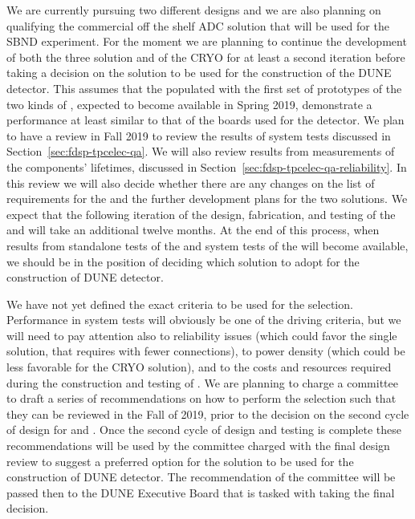 We are currently pursuing two different  designs
and we are also planning on qualifying the commercial off the
shelf ADC solution that will be used for the SBND experiment.
For the moment we are planning to continue the development of
both the three  solution and of the CRYO 
for at least a second iteration before taking a decision on
the  solution to be used for the construction of
the DUNE  detector. This assumes that the 
populated with the first set of prototypes of the two kinds of
, expected to become available in Spring 2019,
demonstrate a performance at least similar to that of the
boards used for the  detector. We plan to have a
review in Fall 2019 to review the results of system tests
discussed in Section~\ref{sec:fdsp-tpcelec-qa}. We will also
review results from measurements of the components' lifetimes,
discussed in Section~\ref{sec:fdsp-tpcelec-qa-reliability}. In this review
we will also decide whether there are any changes on the list
of requirements for the  and the further development
plans for the two solutions. We expect that the following iteration
of the design, fabrication, and testing of the  and
 will take an additional twelve months. At
the end of this process, when results from standalone tests of the
 and system tests of the  will become
available, we should be in the position of deciding which 
solution to adopt for the construction of DUNE  detector.

We have not yet defined the exact criteria to be used for the
 selection. Performance in system tests will obviously
be one of the driving criteria, but we will need to pay attention
also to reliability issues (which could favor the single 
solution, that requires  with fewer connections), to
power density (which could be less favorable for the CRYO solution),
and to the costs and resources required during the construction
and testing of . We are planning to charge a committee
to draft a series of recommendations on how to perform the
 selection such that they can be reviewed in the Fall
of 2019, prior to the decision on the second cycle of design for
 and . Once the second cycle of design
and testing is complete these recommendations will be used by the
committee charged with the final design review to suggest a
preferred option for the  solution to be used for the
construction of DUNE  detector. The recommendation of
the committee will be passed then to the DUNE Executive Board
that is tasked with taking the final  decision.

